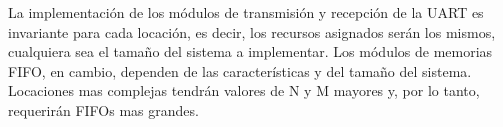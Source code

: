 	La implementación de los módulos de transmisión y recepción de la UART es invariante para cada locación, es decir, los recursos asignados serán los mismos, cualquiera sea el tamaño del sistema a implementar. Los módulos de memorias FIFO, en cambio, dependen de las características y del tamaño del sistema. Locaciones mas complejas tendrán valores de N y M mayores y, por lo tanto, requerirán FIFOs mas grandes. 
	
	
	
	

	
	
